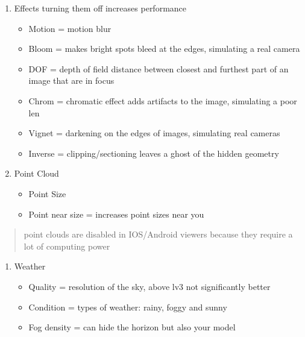\documentclass[letterpaper,10pt,english]{sphinxmanual}
\begin{document}
\begin{enumerate}
%
\setcounter{enumi}{11}
\item {} 
\sphinxAtStartPar
Effects \sphinxhyphen{} turning them off increases performance
\begin{itemize}
\item {} 
\sphinxAtStartPar
Motion = motion blur

\item {} 
\sphinxAtStartPar
Bloom = makes bright spots bleed at the edges, simulating a real camera

\item {} 
\sphinxAtStartPar
DOF = depth of field \sphinxhyphen{} distance between closest and furthest part of an image that are in focus

\item {} 
\sphinxAtStartPar
Chrom = chromatic effect \sphinxhyphen{} adds artifacts to the image, simulating a poor len

\item {} 
\sphinxAtStartPar
Vignet = darkening on the edges of images, simulating real cameras

\item {} 
\sphinxAtStartPar
Inverse = clipping/sectioning leaves a ghost of the hidden geometry

\end{itemize}

\item {} 
\sphinxAtStartPar
Point Cloud
\begin{itemize}
\item {} 
\sphinxAtStartPar
Point Size

\item {} 
\sphinxAtStartPar
Point near size = increases point sizes near you

\end{itemize}

\end{enumerate}
\begin{quote}

\sphinxAtStartPar
{} point clouds are disabled in IOS/Android viewers because they require a lot of computing power
\end{quote}
\begin{enumerate}
%
\setcounter{enumi}{13}
\item {} 
\sphinxAtStartPar
Weather
\begin{itemize}
\item {} 
\sphinxAtStartPar
Quality = resolution of the sky, above lv3 not significantly better

\item {} 
\sphinxAtStartPar
Condition = types of weather: rainy, foggy and sunny

\item {} 
\sphinxAtStartPar
Fog density = can hide the horizon but also your model

\end{itemize}

\end{enumerate}
\end{document}
